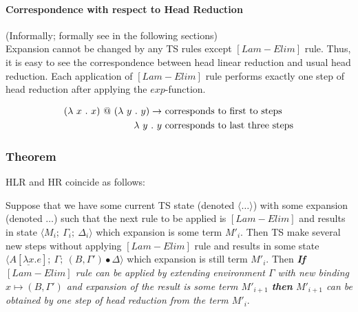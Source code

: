 \documentclass[a4paper, 10pt]{article}
\begin{document}
\paragraph{Correspondence with respect to Head Reduction} (Informally; formally see in the following sections) \\
Expansion cannot be changed by any TS rules except $[Lam-Elim]$ rule. Thus, 
it is easy to see the correspondence between head linear reduction and usual head
reduction. Each application of $[Lam-Elim]$ rule performs exactly one step of head
reduction after applying the $exp$-function.

\begin{align*}
  (\lambda \ x\ .\ x)\ @\ (\lambda \ y\ .\  y) \rightarrow &\ \textnormal{corresponds to first to steps} \\
  \lambda \ y\ .\ y  &\ \textnormal{corresponds to last three steps}
\end{align*}

\subsubsection{Theorem} HLR and HR coincide as follows:

Suppose that we have some current TS state (denoted $\langle \dots \rangle$) with some expansion (denoted $\dots$)
such that the next rule to be applied is $[Lam-Elim]$ and results in state $\langle M_i;\ \Gamma_i;\ \Delta_i \rangle$ which
expansion is some term $M'_i$. Then TS make several new steps without applying $[Lam-Elim]$ rule and results in some
state $\langle A[\underline{\lambda x}. e];\ \Gamma;\ (B,\Gamma')\bullet\Delta \rangle$ which expansion is still term
$M'_i$. Then 
\emph{\textbf{If} $[Lam-Elim]$ rule can be applied by extending environment $\Gamma$ with new binding 
  $x \mapsto (B,\Gamma')$ and expansion of the result is some term $M'_{i+1}$
  \textbf{then} $M'_{i+1}$ can be obtained by one step of head reduction from the term $M'_i$}.

\end{document}
